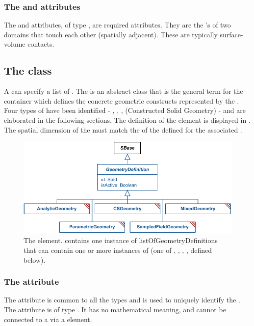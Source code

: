 \subsubsection{The \fixttspace{} and  attributes}
The  and  attributes, of type , are required attributes. They are the 's of two domains that touch each other (spatially adjacent).  These are typically surface-volume contacts.


\subsection{The  class}
\label{geometrydefinition-class}
A \Geometry can specify a list of \GeometryDefinitions. The \GeometryDefinition is an abstract class that is the general term for the container which defines the concrete geometric constructs represented by the \Geometry. Four types of \GeometryDefinitions have been identified - \AnalyticGeometry, \SampledFieldGeometry, \ParametricGeometry, \CSGeometry (Constructed Solid Geometry) - and are elaborated in the following sections. The definition of the \GeometryDefinition element is displayed in .  The spatial dimension of the \GeometryDefinition must match the  of the \DomainType defined for the associated \Domain.

\begin{figure}[ht]
  \includegraphics{figs/GeometryDefinition-uml}
  \caption{The \GeometryDefinition element. \Geometry contains one instance of listOfGeometryDefinitions that can contain one or more instances of \GeometryDefinition (one of \AnalyticGeometry, \SampledFieldGeometry, \CSGeometry, \ParametricGeometry, defined below).}
  \label{GeometryDefinition-uml}
\end{figure}

\subsubsection{The \fixttspace{} attribute}
The  attribute is common to all the \GeometryDefinition types and is used to uniquely identify the \GeometryDefinition. The attribute is of type .  It has no mathematical meaning, and cannot be connected to a \Parameter via a \SpatialSymbolReference element.

